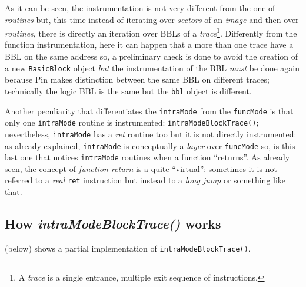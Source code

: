 \documentclass[a4paper,10pt]{report}
\begin{document}
\noindent
As it can be seen, the instrumentation is not very different from the one
of \emph{routines} but, this time instead of iterating over \emph{sectors} of an \emph{image} and then over \emph{routines}, 
there is directly an iteration over BBLs of a 
\emph{trace}\footnote{A \emph{trace} is a single entrance, multiple exit sequence of instructions.}. Differently from the function instrumentation, here it can happen 
that a more than one trace have a BBL on the same address so, 
a preliminary check is done to avoid the creation of 
a new \verb|BasicBlock| object \emph{but} the instrumentation of the BBL \emph{must}
be done again because Pin makes distinction between the same BBL on different traces; 
technically the logic BBL is the same but the \verb|bbl| object is different.

Another peculiarity that differentiates the \verb|intraMode| from
 the \verb|funcMode| is that only one \verb|intraMode| routine is instrumented: 
\verb|intraModeBlockTrace()|; nevertheless, \verb|intraMode| has a \emph{ret} routine
too but it is not directly instrumented: as already explained, 
\verb|intraMode| is conceptually a \emph{layer} over \verb|funcMode| so, 
is this last one that notices \verb|intraMode| routines when a function ``returns''.
As already seen, the concept of \emph{function return} is a quite ``virtual'': 
sometimes it is not referred to a \emph{real} \verb|ret| instruction 
but instead to a \emph{long jump} or something like that. 

\subsection{How \emph{intraModeBlockTrace()} works}

 (below) shows a partial 
implementation of \verb|intraModeBlockTrace()|.
\end{document}
